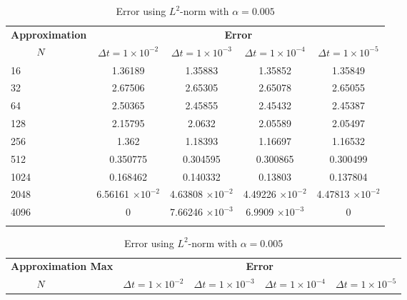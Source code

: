 	\begin{table}[H]
	\begin{tabular}{lcccc}
		\toprule
		\multicolumn{1}{c}{\textbf{Approximation}} & \multicolumn{4}{c}{\textbf{Error}} \\
		$\hspace{9mm}N$ & $\Delta t=1\times 10^{-2}$ & $\Delta t=1\times 10^{-3}$ & $\Delta t=1\times 10^{-4}$ & $\Delta t=1\times 10^{-5}$ \\
		\midrule
		\hspace{7mm} 16 & 1.36189   & 1.35883    & 1.35852   & 1.35849   \\
		\midrule
		\hspace{7mm} 32 & 2.67506   & 2.65305    & 2.65078   & 2.65055   \\
		\midrule
		\hspace{7mm} 64 & 2.50365   & 2.45855    & 2.45432   & 2.45387   \\
		\midrule
		\hspace{7mm} 128 & 2.15795   & 2.0632     & 2.05589   & 2.05497   \\
		\midrule
		\hspace{7mm} 256 & 1.362     & 1.18393    & 1.16697   & 1.16532   \\
		\midrule
		\hspace{7mm} 512 & 0.350775  & 0.304595   & 0.300865  & 0.300499  \\
		\midrule
		\hspace{7mm} 1024 & 0.168462  & 0.140332   & 0.13803   & 0.137804  \\
		\midrule
		\hspace{7mm} 2048 & 6.56161 $\times 10^{-2}$ & 4.63808 $\times 10^{-2}$  & 4.49226 $\times 10^{-2}$ & 4.47813 $\times 10^{-2}$ \\
		\midrule
		\hspace{7mm} 4096 & 0         & 7.66246 $\times 10^{-3}$ & 6.9909 $\times 10^{-3}$ & 0         \\
		\\
		\bottomrule
	\end{tabular}
	\caption{Error using $L^2$-norm with $\alpha=0.005$}
	\label{Collocation_tabla_L2_alpha=005}
	\vspace{1cm}
	\begin{tabular}{lcccc}
		\toprule
		\multicolumn{1}{c}{\textbf{Approximation Max}} & \multicolumn{4}{c}{\textbf{Error}} \\
		$\hspace{9mm}N$ & $\Delta t=1\times 10^{-2}$ & $\Delta t=1\times 10^{-3}$ & $\Delta t=1\times 10^{-4}$ & $\Delta t=1\times 10^{-5}$ \\

\end{tabular}
\end{table}

